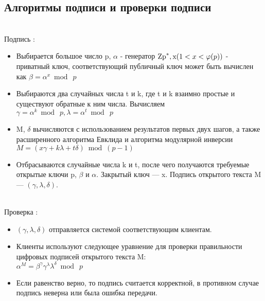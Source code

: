 \documentclass[a4paper]{article}
\begin{document}
\subsection*{Алгоритмы подписи и проверки подписи}\\
\caption{Подпись :}
\begin{itemize}
    \item Выбирается большое число p, $\alpha$ - генератор ${\rm Zp}^{\ast}, {\rm x}(1 < x < \varphi(p))$ - приватный ключ, соответствующий публичный ключ может быть вычислен как $\beta=\alpha^{x}\bmod\ p$
    \item Выбираются два случайных числа t и k, где t и k взаимно простые и существуют обратные к ним числа. Вычисляем $\gamma=\alpha^{k}\bmod\ p, \lambda=\alpha^{t}\bmod\ p$
    \item M, $\delta$ вычисляются с использованием результатов первых двух шагов, а также расширенного алгоритма Евклида и алгоритма модулярной инверсии $M=(x\gamma+k\lambda+t\delta)\bmod(p-1)$
    \item Отбрасываются случайные числа k и t, после чего получаются требуемые открытые ключи p, $\beta$ и $\alpha$. Закрытый ключ — x. Подпись открытого текста M — $(\gamma, \lambda, \delta)$.
\end{itemize}
\\
\caption{Проверка :}
\begin{itemize}
    \item $(\gamma, \lambda, \delta)$ отправляется системой соответствующим клиентам. \item Клиенты используют следующее уравнение для проверки правильности цифровых подписей открытого текста M:\\
    $\alpha^{M}=\beta^{\gamma}\gamma^{\lambda}\lambda^{\delta}\bmod\ p$
    \item Если равенство верно, то подпись считается корректной, в противном случае подпись неверна или была ошибка передачи. 
\end{itemize}
    
\end{document}
